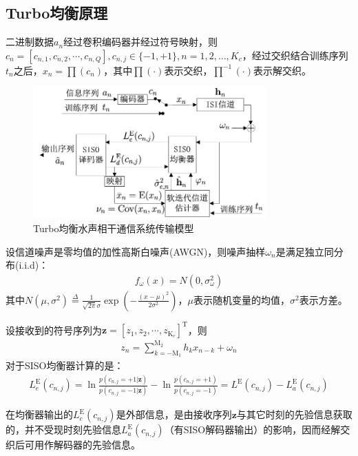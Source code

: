 \subsection{Turbo均衡原理}
二进制数据$a_n$经过卷积编码器并经过符号映射，则$c_n=[c_{n,1},c_{n,2},\cdots,c_{n,Q}],c_{n,j}\in\{-1,+1\},n=1,2,\ldots,K_c$，经过交织结合训练序列$t_n$之后，$x_n=\prod(c_n)$，其中$\prod(\cdot)$表示交织，$\prod^{-1}(\cdot)$表示解交织。

\begin{figure}[htb]
  \begin{center}
    \includegraphics[width=0.8\textwidth]{images/totalcomm2.pdf}
  \end{center}
  \caption{Turbo均衡水声相干通信系统传输模型}
  \label{fig:2.4}
\end{figure}

设信道噪声是零均值的加性高斯白噪声(AWGN)，则噪声抽样$\omega_n$是满足独立同分布(i.i.d)：
\begin{eqnarray}
    f_{\omega}(x)=N(0,\sigma_{\omega}^2)
    \label{equ:2.32}
\end{eqnarray}
其中$N(\mu,\sigma^2)\overset{\Delta}{=}\frac{1}{\sqrt{2\pi}\sigma}\exp\left(-\frac{(x-\mu)^2}{2\sigma^2}\right)$，$\mu$表示随机变量的均值，$\sigma^2$表示方差。

设接收到的符号序列为$\mathbf{z}=[z_1,z_2,\cdots,z_{\mathrm{K}_c}]^{\mathrm{T}}$，则
\begin{eqnarray}
    z_n=\sum_{k=-\mathrm{M}_1}^{\mathrm{M}_2}h_kx_{n-k}+\omega_n
    \label{equ:2.33}
\end{eqnarray}
对于SISO均衡器计算的是：
\begin{eqnarray}
    L_e^{\mathrm{E}}(c_{n,j})=\ln\frac{p(c_{n,j}=+1|\mathbf{z})}{p(c_{n,j}=-1|\mathbf{z})}-\ln\frac{p(c_{n,j}=+1)}{p(c_{n,j}=-1)}=L^{\mathrm{E}}(c_{n,j})-L_a^{\mathrm{E}}(c_{n,j})
    \label{equ:2.34}
\end{eqnarray}

在均衡器输出的$L_e^{\mathrm{E}}(c_{n,j})$是外部信息，是由接收序列$\mathbf{z}$与其它时刻的先验信息获取的，并不受现时刻先验信息$L_a^{\mathrm{E}}(c_{n,j})$（有SISO解码器输出）的影响，因而经解交织后可用作解码器的先验信息。

